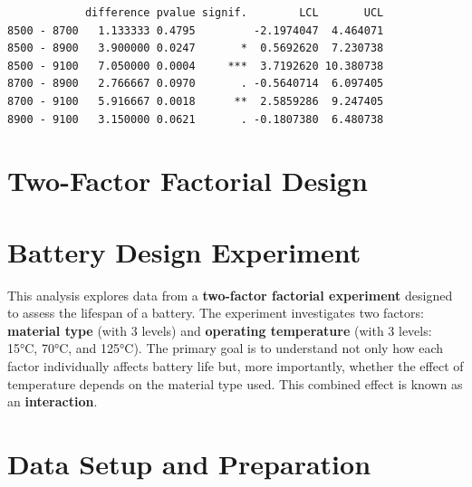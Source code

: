 \documentclass[
  letterpaper,
]{scrbook}
\newenvironment{Shaded}{\begin{snugshade}}{\end{snugshade}}
\newcommand{\AttributeTok}[1]{\textcolor[rgb]{0.40,0.45,0.13}{#1}}
\newcommand{\CommentTok}[1]{\textcolor[rgb]{0.37,0.37,0.37}{#1}}
\newcommand{\ConstantTok}[1]{\textcolor[rgb]{0.56,0.35,0.01}{#1}}
\newcommand{\FunctionTok}[1]{\textcolor[rgb]{0.28,0.35,0.67}{#1}}
\newcommand{\NormalTok}[1]{\textcolor[rgb]{0.00,0.23,0.31}{#1}}
\newcommand{\OtherTok}[1]{\textcolor[rgb]{0.00,0.23,0.31}{#1}}
\newcommand{\SpecialCharTok}[1]{\textcolor[rgb]{0.37,0.37,0.37}{#1}}
\newcommand{\StringTok}[1]{\textcolor[rgb]{0.13,0.47,0.30}{#1}}
\begin{document}
\begin{Shaded}
\end{Shaded}

\begin{verbatim}
            difference pvalue signif.        LCL       UCL
8500 - 8700   1.133333 0.4795         -2.1974047  4.464071
8500 - 8900   3.900000 0.0247       *  0.5692620  7.230738
8500 - 9100   7.050000 0.0004     ***  3.7192620 10.380738
8700 - 8900   2.766667 0.0970       . -0.5640714  6.097405
8700 - 9100   5.916667 0.0018      **  2.5859286  9.247405
8900 - 9100   3.150000 0.0621       . -0.1807380  6.480738
\end{verbatim}

\section{Two-Factor Factorial Design}\label{two-factor-factorial-design}

\section{Battery Design Experiment}\label{battery-design-experiment}

This analysis explores data from a \textbf{two-factor factorial
experiment} designed to assess the lifespan of a battery. The experiment
investigates two factors: \textbf{material type} (with 3 levels) and
\textbf{operating temperature} (with 3 levels: 15°C, 70°C, and 125°C).
The primary goal is to understand not only how each factor individually
affects battery life but, more importantly, whether the effect of
temperature depends on the material type used. This combined effect is
known as an \textbf{interaction}.

\section{Data Setup and Preparation}\label{data-setup-and-preparation}
\end{document}
